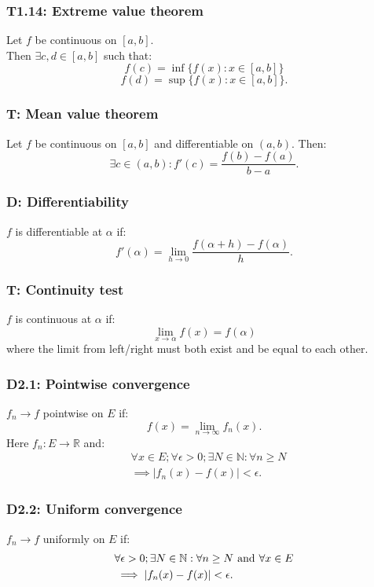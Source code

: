 \documentclass{article}
\begin{document}
\begin{multicols*}{3}
\subsubsection*{T1.14: Extreme value theorem}
Let $f$ be continuous on $[a,b]$. \\
Then $\exists c,d\in[a,b]$ such that:
$$f(c)=\inf\{f(x):x\in[a,b]\}$$
$$f(d)=\sup\{f(x):x\in[a,b]\}.$$

\subsubsection*{T: Mean value theorem}
Let $f$ be continuous on $[a,b]$
and differentiable on $(a,b)$.
Then:
$$\exists c\in(a,b):f'(c)=\frac{f(b)-f(a)}{b-a}.$$

\subsubsection*{D: Differentiability}
$f$ is differentiable at $\alpha$ if:
$$f'(\alpha)=\lim_{h\rightarrow0}
\frac{f(\alpha+h)-f(\alpha)}{h}.$$

\subsubsection*{T: Continuity test}
$f$ is continuous at $\alpha$ if:
$$\lim_{x\rightarrow\alpha}f(x)=f(\alpha)$$
where the limit from left/right must both exist
and be equal to each other.

\subsubsection*{D2.1: Pointwise convergence}
$f_n\rightarrow f$ pointwise on $E$ if:
$$f(x)=\lim_{n\rightarrow\infty}f_n(x).$$
Here $f_n:E\rightarrow\mathbb{R}$ and:
\begin{align*}
    &\forall x\in E;\forall\epsilon>0;
    \exists N\in\mathbb{N}:\forall n\geq N \\
    &\implies |f_n(x)-f(x)|<\epsilon.
\end{align*}

\subsubsection*{D2.2: Uniform convergence}
$f_n\rightarrow f$ uniformly on $E$ if:
\begin{align*}
    &\forall\epsilon>0;
    \exists N\in\mathbb{N}:\forall n\geq N
    \hspace{0.05in}\text{and}\hspace{0.05in}
    \forall x\in E \\
    &\implies |f_n(x)-f(x)|<\epsilon.
\end{align*}


\end{multicols*}
\end{document}
